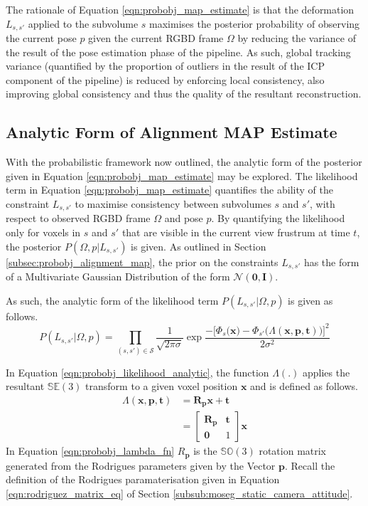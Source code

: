 The rationale of Equation \ref{eqn:probobj_map_estimate} is that the deformation
$L_{s, s'}$ applied to the subvolume $s$ maximises the posterior probability of
observing the current pose $p$ given the current RGBD frame $\Omega$ by reducing
the variance of the result of the pose estimation phase of the pipeline. As such,
global tracking variance (quantified by the proportion of outliers in the result
of the ICP component of the pipeline) is reduced by enforcing local consistency,
also improving global consistency and thus the quality of the resultant
reconstruction.

\subsection{Analytic Form of Alignment MAP Estimate}
\label{subsec:probobj_analytic_alignment_map}
With the probabilistic framework now outlined, the analytic form of the
posterior given in Equation \ref{eqn:probobj_map_estimate} may be explored. The
likelihood term in Equation \ref{eqn:probobj_map_estimate} quantifies the
ability of the constraint $L_{s, s'}$ to maximise consistency between subvolumes
$s$ and $s'$, with respect to observed RGBD frame $\Omega$ and pose $p$. By
quantifying the likelihood only for voxels in $s$ and $s'$ that are visible in
the current view frustrum at time $t$, the posterior $P(\Omega, p | L_{s, s'})$
is given. As outlined in Section \ref{subsec:probobj_alignment_map}, the prior
on the constraints $L_{s, s'}$ has the form of a Multivariate Gaussian
Distribution of the form $\mathcal{N}(\mathbf{0}, \mathbf{I})$.

As such, the analytic form of the likelihood term $P(L_{s, s'} | \Omega, p)$ is
given as follows.
\begin{equation}
  \label{eqn:probobj_likelihood_analytic}
  P(L_{s, s'} | \Omega, p) = \prod_{(s, s') \in \mathcal{S}}
  \frac{1}{\sqrt{2 \pi \sigma}}
  \exp{\frac{-\Big[\Phi_{s}\Big(\mathbf{x}\Big) -
  \Phi_{s'}\Big(\Lambda(\mathbf{x}, \mathbf{p}, \mathbf{t})\Big)\Big]^{2}}
  {2\sigma^{2}}}
\end{equation}

In Equation \ref{eqn:probobj_likelihood_analytic}, the function $\Lambda(.)$
applies the resultant $\mathbb{SE}(3)$ transform to a given voxel position
$\mathbf{x}$ and is defined as follows.
\begin{align}
  \label{eqn:probobj_lambda_fn}
  \Lambda(\mathbf{x}, \mathbf{p}, \mathbf{t}) &=
  \mathbf{R}_{\mathbf{p}} \mathbf{x} + \mathbf{t}\\
  &= 
  \begin{bmatrix}
    \mathbf{R}_{\mathbf{p}} & \mathbf{t} \\
    \mathbf{0} & 1
  \end{bmatrix}
  \mathbf{x}
\end{align}
In Equation \ref{eqn:probobj_lambda_fn} $R_{\mathbf{p}}$ is the $\mathbb{SO}(3)$
rotation matrix generated from the Rodrigues parameters given by the Vector
$\mathbf{p}$. Recall the definition of the Rodrigues paramaterisation given in
Equation \ref{eqn:rodriguez_matrix_eq} of Section
\ref{subsub:moseg_static_camera_attitude}.


